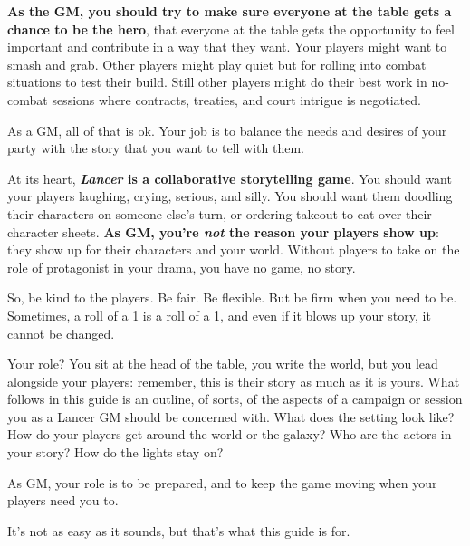 \textbf{As the GM, you should try to make sure everyone at the table gets a chance to be the hero},
that everyone at the table gets the opportunity to feel important and contribute in a way that they
want. Your players might want to smash and grab. Other players might play quiet but for rolling
into combat situations to test their build. Still other players might do their best work in no-
combat sessions where contracts, treaties, and court intrigue is negotiated.

As a GM, all of that is ok. Your job is to balance the needs and desires of your party with the
story that you want to tell with them.

At its heart,\textbf{ \textit{Lancer} is a collaborative storytelling game}. You should want your players
laughing, crying, serious, and silly. You should want them doodling their characters on someone
else's turn, or ordering takeout to eat over their character sheets. \textbf{As GM, you're \textit{not} the reason
your players show up}: they show up for their characters and your world. Without players to take
on the role of protagonist in your drama, you have no game, no story.

So, be kind to the players. Be fair. Be flexible. But be firm when you need to be. Sometimes, a
roll of a 1 is a roll of a 1, and even if it blows up your story, it cannot be changed.

Your role? You sit at the head of the table, you write the world, but you lead alongside your
players: remember, this is their story as much as it is yours. What follows in this guide is an
outline, of sorts, of the aspects of a campaign or session you as a Lancer GM should be
concerned with. What does the setting look like? How do your players get around the world or
the galaxy? Who are the actors in your story? How do the lights stay on?

As GM, your role is to be prepared, and to keep the game moving when your players need you
to.

It's not as easy as it sounds, but that's what this guide is for.